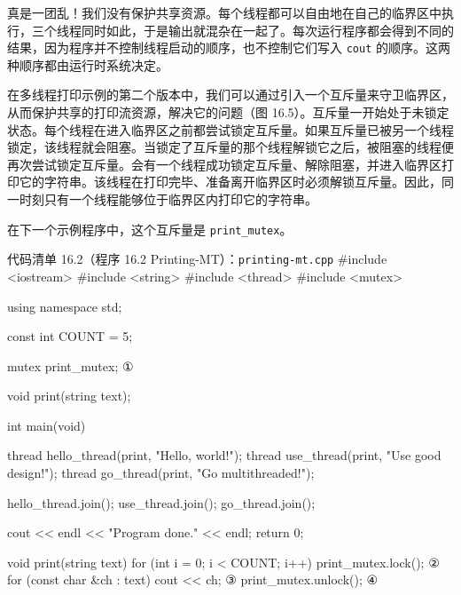 真是一团乱！我们没有保护共享资源。每个线程都可以自由地在自己的临界区中执行，三个线程同时如此，于是输出就混杂在一起了。每次运行程序都会得到不同的结果，因为程序并不控制线程启动的顺序，也不控制它们写入 \texttt{cout} 的顺序。这两种顺序都由运行时系统决定。

在多线程打印示例的第二个版本中，我们可以通过引入一个互斥量来守卫临界区，从而保护共享的打印流资源，解决它的问题（图 16.5）。互斥量一开始处于未锁定状态。每个线程在进入临界区之前都尝试锁定互斥量。如果互斥量已被另一个线程锁定，该线程就会阻塞。当锁定了互斥量的那个线程解锁它之后，被阻塞的线程便再次尝试锁定互斥量。会有一个线程成功锁定互斥量、解除阻塞，并进入临界区打印它的字符串。该线程在打印完毕、准备离开临界区时必须解锁互斥量。因此，同一时刻只有一个线程能够位于临界区内打印它的字符串。


在下一个示例程序中，这个互斥量是 \texttt{print\_\allowbreak{}mutex}。

\begin{codeboxt}{代码清单 16.2（程序 16.2 Printing-MT）：\texttt{printing-mt.\allowbreak{}cpp}}
#include <iostream>
#include <string>
#include <thread>
#include <mutex>

using namespace std;

const int COUNT = 5;

mutex print_mutex;                                  ①

void print(string text);

int main(void)
{
    thread hello_thread(print, "Hello, world!\n");
    thread use_thread(print, "Use good design!\n");
    thread go_thread(print, "Go multithreaded!\n");

    hello_thread.join();
    use_thread.join();
    go_thread.join();

    cout << endl << "Program done." << endl;
    return 0;
}

void print(string text)
{
    for (int i = 0; i < COUNT; i++)
    {
        print_mutex.lock();                         ②
        {
            for (const char &ch : text) cout << ch; ③
        }
        print_mutex.unlock();                       ④
    }
}
\end{codeboxt}
\par
{}\par
{}\par
{}\par

